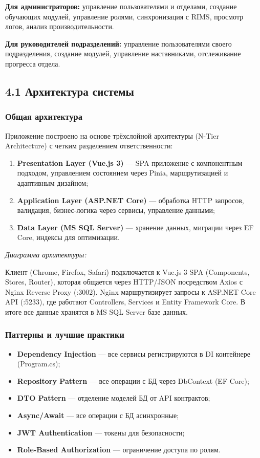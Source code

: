 \textbf{Для администраторов:} управление пользователями и отделами, создание обучающих модулей, управление ролями, синхронизация с RIMS, просмотр логов, анализ производительности.

\textbf{Для руководителей подразделений:} управление пользователями своего подразделения, создание модулей, управление наставниками, отслеживание прогресса отдела.


\subsection{4.1 Архитектура системы}

\subsubsection{Общая архитектура}

Приложение построено на основе трёхслойной архитектуры (N-Tier Architecture) с четким разделением ответственности:

\begin{enumerate}
    \item \textbf{Presentation Layer (Vue.js 3)} --- SPA приложение с компонентным подходом, управлением состоянием через Pinia, маршрутизацией и адаптивным дизайном;
    \item \textbf{Application Layer (ASP.NET Core)} --- обработка HTTP запросов, валидация, бизнес-логика через сервисы, управление данными;
    \item \textbf{Data Layer (MS SQL Server)} --- хранение данных, миграции через EF Core, индексы для оптимизации.
\end{enumerate}

\textit{Диаграмма архитектуры:}

Клиент (Chrome, Firefox, Safari) подключается к Vue.js 3 SPA (Components, Stores, Router), которая общается через HTTP/JSON посредством Axios с Nginx Reverse Proxy (:3002). Nginx маршрутизирует запросы к ASP.NET Core API (:5233), где работают Controllers, Services и Entity Framework Core. В итоге все данные хранятся в MS SQL Server базе данных.

\subsubsection{Паттерны и лучшие практики}

\begin{itemize}
    \item \textbf{Dependency Injection} --- все сервисы регистрируются в DI контейнере (Program.cs);
    \item \textbf{Repository Pattern} --- все операции с БД через DbContext (EF Core);
    \item \textbf{DTO Pattern} --- отделение моделей БД от API контрактов;
    \item \textbf{Async/Await} --- все операции с БД асинхронные;
    \item \textbf{JWT Authentication} --- токены для безопасности;
    \item \textbf{Role-Based Authorization} --- ограничение доступа по ролям.
\end{itemize}


